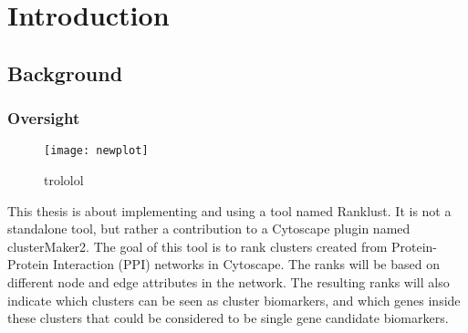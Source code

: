 \part{Introduction}
\label{pa:intro}
\chapter{Background}
\section{Oversight}
\begin{figure}
    \label{fig:testfig}
    \texttt{[image: newplot]}
    \caption{trololol}
\end{figure}
This thesis is about implementing and using a tool named Ranklust. It is not
a standalone tool, but rather a contribution to a Cytoscape plugin named
clusterMaker2\cite{cm2}\cite{cm2-github}. The goal of this tool is to rank
clusters created from Protein-Protein Interaction (PPI) networks in Cytoscape.
The ranks will be based on different node and edge attributes in the network.
The resulting ranks will also indicate which clusters can be seen as cluster
biomarkers, and which genes inside these clusters that could be considered to be
single gene candidate biomarkers. 

